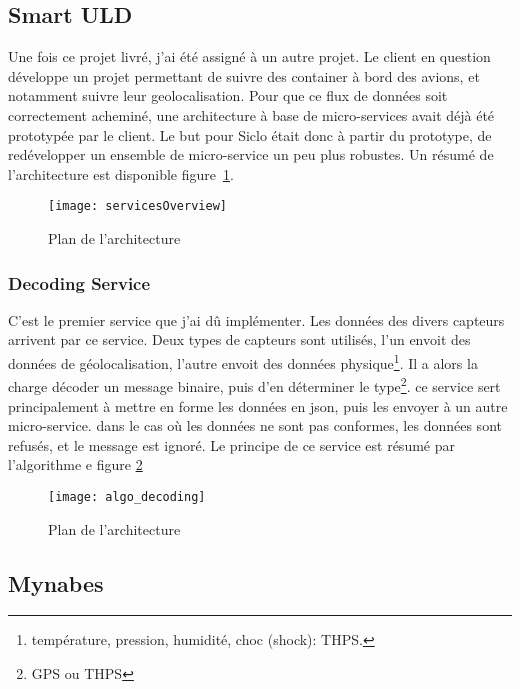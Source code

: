 \documentclass[../rapport.tex]{subfiles}
\begin{document}
        \subsection{Smart ULD}
        Une fois ce projet livré, j'ai été assigné à un autre projet.
        Le client en question développe un projet permettant de suivre des container
        à bord des avions, et notamment suivre leur geolocalisation.
        Pour que ce flux de données soit correctement acheminé, une architecture à base de micro-services
        avait déjà été prototypée par le client. Le but pour Siclo était donc à
        partir du prototype, de 
        redévelopper un ensemble de micro-service un peu plus robustes. Un
        résumé de l'architecture est disponible figure~\ref{fig:overview}.

        \begin{figure}
            \centering
            \texttt{[image: servicesOverview]}
            \caption{Plan de l'architecture}
            \label{fig:overview}
        \end{figure}

        \subsubsection{Decoding Service}
        C'est le premier service que j'ai dû implémenter. 
        Les données des divers capteurs arrivent par ce service. Deux types de capteurs sont utilisés, l'un envoit des données de géolocalisation, l'autre envoit des données physique\footnote{température, pression, humidité, choc (shock): THPS.}. Il a alors la charge décoder un message binaire, puis d'en déterminer le type\footnote{GPS ou THPS}. ce service sert principalement à mettre en forme les données en \gls{json}, puis les envoyer à un autre micro-service. dans le cas où les données ne sont pas conformes, les données sont refusés, et le message est ignoré.
        Le principe de ce service est résumé par l'algorithme e figure \ref{fig:algo_decoding}

        \begin{figure}
            \centering
            \texttt{[image: algo\_decoding]}
            \caption{Plan de l'architecture}
            \label{fig:algo_decoding}
        \end{figure}

        \subsection{Mynabes}\label{subsec:mynabes}
\end{document}
